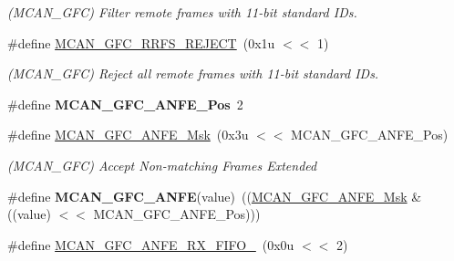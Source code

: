 \begin{DoxyCompactItemize}
\begin{DoxyCompactList}\small\item\em (M\+C\+A\+N\+\_\+\+G\+FC) Filter remote frames with 11-\/bit standard I\+Ds. \end{DoxyCompactList}\item 
\mbox{\label{group__SAME70__MCAN_gac5f997ee8b26196347d65f79017d3c35}} 
\#define \mbox{\hyperlink{group__SAME70__MCAN_gac5f997ee8b26196347d65f79017d3c35}{M\+C\+A\+N\+\_\+\+G\+F\+C\+\_\+\+R\+R\+F\+S\+\_\+\+R\+E\+J\+E\+CT}}~(0x1u $<$$<$ 1)
\begin{DoxyCompactList}\small\item\em (M\+C\+A\+N\+\_\+\+G\+FC) Reject all remote frames with 11-\/bit standard I\+Ds. \end{DoxyCompactList}\item 
\mbox{\label{group__SAME70__MCAN_ga93422466fc0a51e9a4ae1a29e88a0673}} 
\#define {\bfseries M\+C\+A\+N\+\_\+\+G\+F\+C\+\_\+\+A\+N\+F\+E\+\_\+\+Pos}~2
\item 
\mbox{\label{group__SAME70__MCAN_gaecfca3fbc83ce91d1c4bfe69bf669a47}} 
\#define \mbox{\hyperlink{group__SAME70__MCAN_gaecfca3fbc83ce91d1c4bfe69bf669a47}{M\+C\+A\+N\+\_\+\+G\+F\+C\+\_\+\+A\+N\+F\+E\+\_\+\+Msk}}~(0x3u $<$$<$ M\+C\+A\+N\+\_\+\+G\+F\+C\+\_\+\+A\+N\+F\+E\+\_\+\+Pos)
\begin{DoxyCompactList}\small\item\em (M\+C\+A\+N\+\_\+\+G\+FC) Accept Non-\/matching Frames Extended \end{DoxyCompactList}\item 
\mbox{\label{group__SAME70__MCAN_ga20ac52d3ae84921682d39465d271eacb}} 
\#define {\bfseries M\+C\+A\+N\+\_\+\+G\+F\+C\+\_\+\+A\+N\+FE}(value)~((\mbox{\hyperlink{group__SAMV71__MCAN_gaecfca3fbc83ce91d1c4bfe69bf669a47}{M\+C\+A\+N\+\_\+\+G\+F\+C\+\_\+\+A\+N\+F\+E\+\_\+\+Msk}} \& ((value) $<$$<$ M\+C\+A\+N\+\_\+\+G\+F\+C\+\_\+\+A\+N\+F\+E\+\_\+\+Pos)))
\item 
\mbox{\label{group__SAME70__MCAN_gab95a6af22d1c094c6c31230bbc0e5102}} 
\#define \mbox{\hyperlink{group__SAME70__MCAN_gab95a6af22d1c094c6c31230bbc0e5102}{M\+C\+A\+N\+\_\+\+G\+F\+C\+\_\+\+A\+N\+F\+E\+\_\+\+R\+X\+\_\+\+F\+I\+F\+O\+\_}}~(0x0u $<$$<$ 2)

\end{DoxyCompactItemize}
